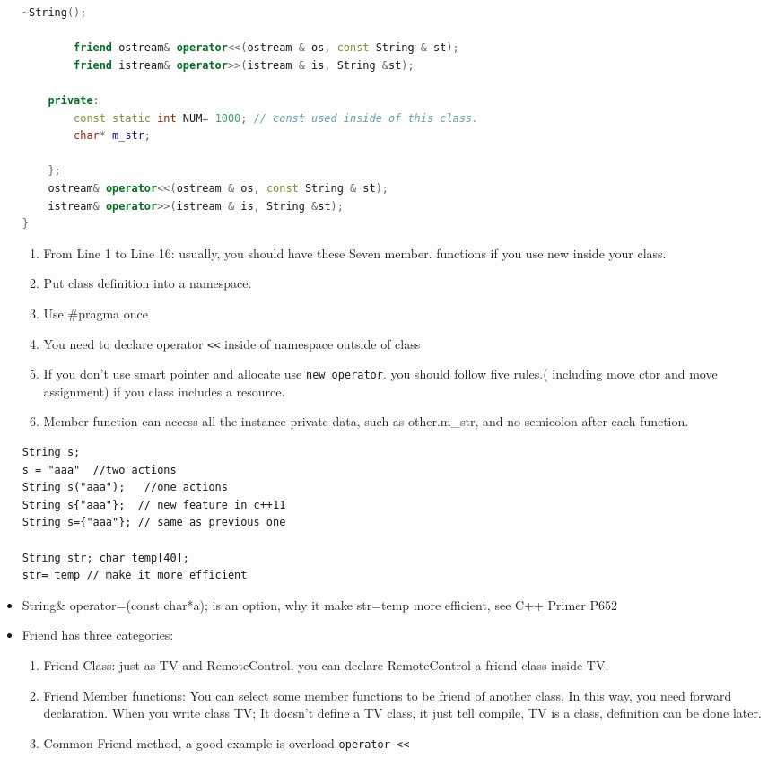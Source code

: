 \documentclass[a4paper,11pt,twoside]{book}
\begin{document}
\begin{itemize}
\begin{lstlisting}[frame=single, language=c++]
		~String();  
		
		friend ostream& operator<<(ostream & os, const String & st);
		friend istream& operator>>(istream & is, String &st);
		
	private:
		const static int NUM= 1000; // const used inside of this class.
		char* m_str;
		
	};
	ostream& operator<<(ostream & os, const String & st);
	istream& operator>>(istream & is, String &st);
}
\end{lstlisting}
	
	\begin{enumerate}
		\item From Line 1 to Line 16: usually, you should have these Seven member. functions if you use new inside your class.
		\item Put class definition into a namespace.
		\item Use \#pragma once
		\item You need to declare operator \verb=<<= inside of namespace outside of class
		\item If you don't use smart pointer and allocate use \texttt{new operator}. you should follow five rules.( including move ctor and move assignment) if you class includes a resource.
		\item Member function can access all the instance private data, such as other.m\_str, and no semicolon after each function.
	\end{enumerate}
	
	
\begin{lstlisting}[numbers=none]
String s;
s = "aaa"  //two actions
String s("aaa");   //one actions
String s{"aaa"};  // new feature in c++11
String s={"aaa"}; // same as previous one
	
String str; char temp[40];
str= temp // make it more efficient
\end{lstlisting}
	
	\item String\& operator=(const char*a); is an option, why it make str=temp more efficient, see C++ Primer P652
	
	\item  Friend has three categories:
	\begin{enumerate}
		\item Friend Class: just as TV and RemoteControl, you can declare RemoteControl a friend class inside TV.
		\item Friend Member functions: You can select some member functions to be friend of another class, In this way, you need forward declaration.  When you write class TV;  It doesn't define a TV class, it just tell compile, TV is a class, definition can be done later.
		\item Common Friend method, a good example is overload \verb=operator <<=
	\end{enumerate}
	

\end{itemize}
\end{document}
